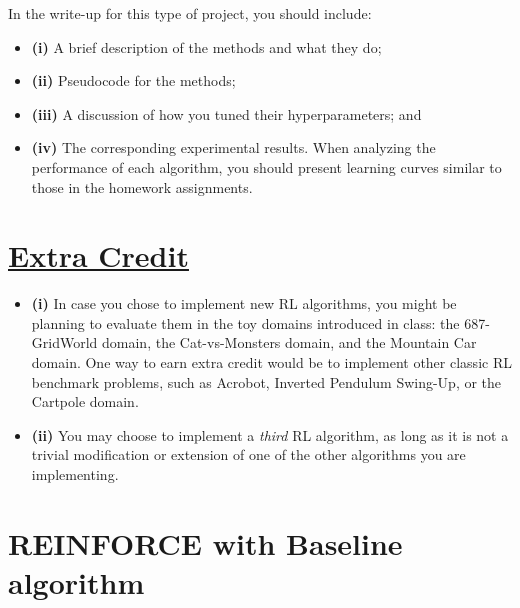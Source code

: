 \documentclass{article}
\begin{document}
\noindent In the write-up for this type of project, you should include:

\begin{itemize}

        \item \textbf{(i)} A brief description of the methods and what they do;

        \item \textbf{(ii)} Pseudocode for the methods;

        \item \textbf{(iii)} A discussion of how you tuned their hyperparameters; and
        \item \textbf{(iv)} The corresponding experimental results. When analyzing the performance of each algorithm, you should present learning curves similar to those in the homework assignments.
\end{itemize}

\section*{\underline{\textbf{Extra Credit}}}
\begin{itemize}

        \item \textbf{(i)} In case you chose to implement new RL algorithms, you might be planning to evaluate them in the toy domains introduced in class: the 687-GridWorld domain, the Cat-vs-Monsters domain, and the Mountain Car domain. One way to earn extra credit would be to implement other classic RL benchmark problems, such as Acrobot, Inverted Pendulum Swing-Up, or the Cartpole domain.

        \item \textbf{(ii)} You may choose to implement a \textit{third} RL algorithm, as long as it is not a trivial modification or extension of one of the other algorithms you are implementing.
\end{itemize}

\section{REINFORCE with Baseline algorithm}
\end{document}
